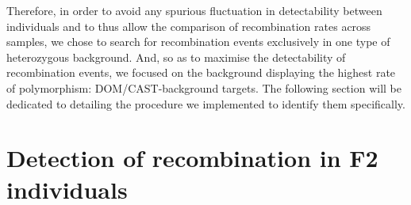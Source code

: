 Therefore, in order to avoid any spurious fluctuation in detectability between individuals and to thus allow the comparison of recombination rates across samples, we chose to search for recombination events exclusively in one type of heterozygous background.
And, so as to maximise the detectability of recombination events, we focused on the background displaying the highest rate of polymorphism: DOM/CAST-background targets.
The following section will be dedicated to detailing the procedure we implemented to identify them specifically.











\section{Detection of recombination in F2 individuals}
